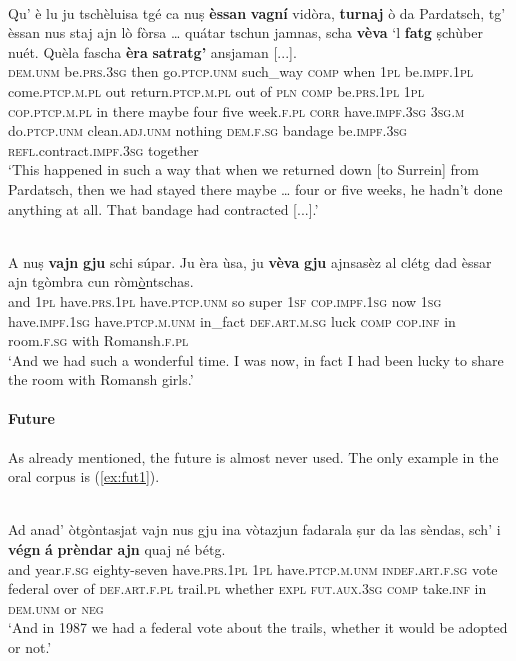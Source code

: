 \ea
\label{}
\\
\gll  Qu' è lu ju tschèluisa tgé ca nuṣ \textbf{èssan} \textbf{vagní} vidòra, \textbf{turnaj} ò da Pardatsch, tg' èssan nus staj ajn lò fòrsa … quátar tschun jamnas, scha \textbf{vèva} `l \textbf{fatg} ṣchùber nuét. Quèla fascha \textbf{èra}  \textbf{satratg’} ansjaman [...]. \\
\textsc{dem.unm} be.\textsc{prs.3sg} then go.\textsc{ptcp.unm} such\_way \textsc{comp} when \textsc{1pl} be.\textsc{impf.1pl} come.\textsc{ptcp.m.pl} out return.\textsc{ptcp.m.pl} out of \textsc{pln} \textsc{comp} be.\textsc{prs.1pl} \textsc{1pl} \textsc{cop.ptcp.m.pl} in there maybe {} four five week.\textsc{f.pl} \textsc{corr} have.\textsc{impf.3sg} \textsc{3sg.m} do.\textsc{ptcp.unm} clean.\textsc{adj.unm} nothing \textsc{dem.f.sg} bandage be.\textsc{impf.3sg} \textsc{refl.}contract.\textsc{impf.3sg} together \\
\glt `This happened in such a way that when we returned down [to Surrein] from Pardatsch, then we had stayed there maybe … four or five weeks, he hadn’t done anything at all. That bandage had contracted [...].'
\z

\ea
\label{}
\\
\gll   A nuṣ \textbf{vajn} \textbf{gju} schi súpar. Ju èra ùsa, ju \textbf{vèva} \textbf{gju} ajnsasèz al clétg dad èssar ajn tgòmbra cun ròm\underline{ò}ntschas.\\
and \textsc{1pl} have.\textsc{prs.1pl} have.\textsc{ptcp.unm} so super \textsc{1sf} \textsc{cop.impf.1sg} now \textsc{1sg} have.\textsc{impf.1sg} have.\textsc{ptcp.m.unm} in\_fact \textsc{def.art.m.sg} luck \textsc{comp} \textsc{cop.inf} in room.\textsc{f.sg} with Romansh.\textsc{f.pl}\\
\glt `And we had such a wonderful time. I was now, in fact I had been lucky to share the room with Romansh girls.'
\z

\paragraph{Future}
As already mentioned, the future is almost never used. The only example in the oral corpus is (\ref{ex:fut1}).

\ea\label{ex:fut1}
\\
\gll Ad anad' òtgòntasjat vajn nus gju ina vòtazjun fadarala ṣur da las sèndas, sch' i \textbf{végn} \textbf{á} \textbf{prèndar} \textbf{ajn} quaj né bétg.   \\
and year.\textsc{f.sg} eighty-seven have.\textsc{prs.1pl} \textsc{1pl} have.\textsc{ptcp.m.unm} \textsc{indef.art.f.sg} vote federal over of \textsc{def.art.f.pl} trail.\textsc{pl} whether \textsc{expl} \textsc{fut.aux.3sg} \textsc{comp} take.\textsc{inf} in \textsc{dem.unm} or \textsc{neg}  \\
\glt `And in 1987 we had a federal vote about the trails, whether it would be adopted or not.'
\z

